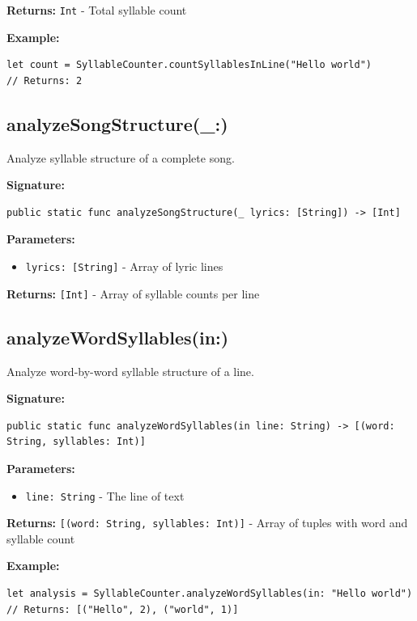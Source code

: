 \documentclass[11pt,a4paper]{article}
\begin{document}
\textbf{Returns:} \texttt{Int} - Total syllable count

\textbf{Example:}
\begin{lstlisting}
let count = SyllableCounter.countSyllablesInLine("Hello world")
// Returns: 2
\end{lstlisting}

\subsection{analyzeSongStructure(\_:)}

Analyze syllable structure of a complete song.

\textbf{Signature:}
\begin{lstlisting}
public static func analyzeSongStructure(_ lyrics: [String]) -> [Int]
\end{lstlisting}

\textbf{Parameters:}
\begin{itemize}
    \item \texttt{lyrics: [String]} - Array of lyric lines
\end{itemize}

\textbf{Returns:} \texttt{[Int]} - Array of syllable counts per line

\subsection{analyzeWordSyllables(in:)}

Analyze word-by-word syllable structure of a line.

\textbf{Signature:}
\begin{lstlisting}
public static func analyzeWordSyllables(in line: String) -> [(word: String, syllables: Int)]
\end{lstlisting}

\textbf{Parameters:}
\begin{itemize}
    \item \texttt{line: String} - The line of text
\end{itemize}

\textbf{Returns:} \texttt{[(word: String, syllables: Int)]} - Array of tuples with word and syllable count

\textbf{Example:}
\begin{lstlisting}
let analysis = SyllableCounter.analyzeWordSyllables(in: "Hello world")
// Returns: [("Hello", 2), ("world", 1)]
\end{lstlisting}
\end{document}
